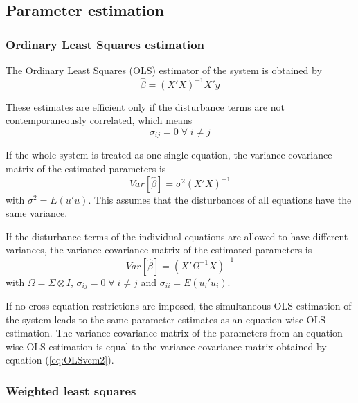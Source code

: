\documentclass[article]{jss}
\begin{document}
\subsection{Parameter estimation}

\subsubsection{Ordinary Least Squares estimation}

The Ordinary Least Squares (OLS) estimator of the system 
is obtained by
\begin{equation}
   \widehat{\beta} = \left( X'X \right)^{-1} X'y
\end{equation}

These estimates are efficient only if the disturbance terms are not 
contemporaneously correlated, which means 
\begin{equation}
   \sigma_{ij} = 0 \; \forall \; i \neq j
\end{equation}

If the whole system is treated as one single equation, 
the variance-covariance matrix of the estimated parameters is
\begin{equation}
   Var \left[ \widehat{\beta} \right] = \sigma^2 \left( X'X \right)^{-1}
\end{equation}
with $\sigma^2 = E \left( u' u \right)$.
This assumes that the disturbances of all equations have the
same variance.

If the disturbance terms of the individual equations 
are allowed to have different variances, 
the variance-covariance matrix of the estimated parameters is
\begin{equation}
   Var \left[ \widehat{\beta} \right] = \left( X' \Omega^{-1} X \right)^{-1}
   \label{eq:OLSvcm2}
\end{equation}
with $\Omega = \Sigma \otimes I$, 
$\sigma_{ij} = 0 \; \forall \; i \neq j$ and
$\sigma_{ii} = E \left( u_i' u_i \right)$.

If no cross-equation restrictions are imposed, the simultaneous 
OLS estimation of the system leads to the same parameter estimates 
as an equation-wise OLS estimation. The variance-covariance matrix 
of the parameters from an equation-wise OLS estimation is equal to 
the variance-covariance matrix obtained by equation 
(\ref{eq:OLSvcm2}).


\subsubsection{Weighted least squares}
\end{document}

